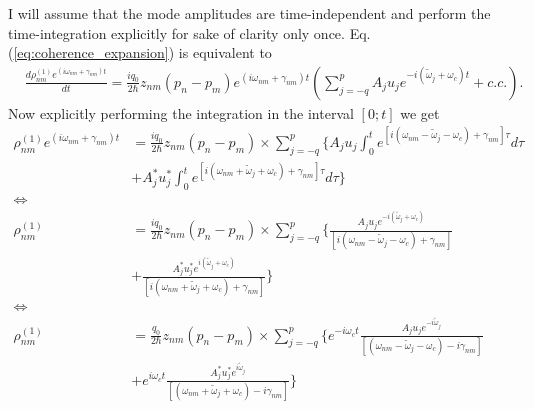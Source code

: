 \documentclass[preprint,secnumarabic,amssymb, nobibnotes, aip, prd]{revtex4-1}
\def\tw{\tilde{\omega}}
\def\tw{\tilde{\omega}}
\begin{document}
	I will assume that the mode amplitudes are time-independent and perform the time-integration explicitly for sake of clarity only once. Eq. (\ref{eq:coherence_expansion}) is equivalent to 
	\begin{align}
	\label{eq:coherence_expansion2}
	& \frac{ d\rho_{nm}^{(1)}e^{(i\omega_{nm}+\gamma_{nm})t}} {dt} = \frac{iq_0}{2\hbar}z_{nm}(p_n-p_m)e^{(i\omega_{nm}+\gamma_{nm})t}(\sum_{j=-q}^{p}A_ju_je^{-i(\tw_j+\omega_c) t} + c.c.). 
	\end{align}
	Now explicitly performing the integration in the interval $[0;t]$ we get
	\begin{align}
	\label{eq:coherence_expansion3} 
	\rho_{nm}^{(1)}e^{(i\omega_{nm}+\gamma_{nm})t} &= \frac{iq_0}{2\hbar}z_{nm}(p_n-p_m)\times \sum_{j=-q}^{p}\Big \{A_ju_j \int_{0}^{t}  e^{[i( \omega_{nm} - \tw_j-\omega_c)+ \gamma_{nm}]\tau} d\tau  \nonumber \\
	&+ A_j^*u_j^* \int_{0}^{t}  e^{[i( \omega_{nm} + \tw_j+\omega_c)+ \gamma_{nm}]\tau} d\tau \Big \} \nonumber \\
	\Leftrightarrow \nonumber \\
	\rho_{nm}^{(1)} &= \frac{iq_0}{2\hbar}z_{nm}(p_n-p_m)\times \sum_{j=-q}^{p} \Big \{\frac{A_ju_j e^{-i(\tw_j +\omega_c)}}{[i( \omega_{nm} - \tw_j-\omega_c)+ \gamma_{nm}]} \nonumber \\
	&+\frac{A_j^*u_j^* e^{i(\tw_j +\omega_c)}}{[i( \omega_{nm} + \tw_j+\omega_c)+ \gamma_{nm}]}
	\Big \} \nonumber \\
	\Leftrightarrow \nonumber \\
	\rho_{nm}^{(1)} &= \frac{q_0}{2\hbar}z_{nm}(p_n-p_m)\times \sum_{j=-q}^{p} \Big \{e^{-i\omega_c t}\frac{A_ju_j e^{-i\tw_j}}{[( \omega_{nm} - \tw_j-\omega_c) -i\gamma_{nm}]} \nonumber \\
	&+e^{i\omega_c t}\frac{A_j^*u_j^* e^{i\tw_j}}{[( \omega_{nm} + \tw_j+\omega_c) -i\gamma_{nm}]}
	\Big \} \nonumber \\
	\end{align}
	
\end{document}
